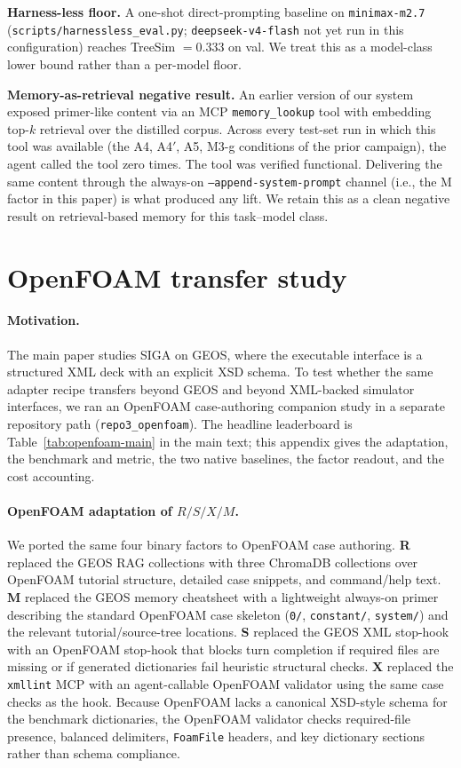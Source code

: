 \documentclass{article}
\begin{document}
\textbf{Harness-less floor.} A one-shot direct-prompting baseline on \texttt{minimax-m2.7} (\texttt{scripts/harnessless\_eval.py}; \texttt{deepseek-v4-flash} not yet run in this configuration) reaches TreeSim $= 0.333$ on val. We treat this as a model-class lower bound rather than a per-model floor.

\textbf{Memory-as-retrieval negative result.} An earlier version of our system exposed primer-like content via an MCP \texttt{memory\_lookup} tool with embedding top-$k$ retrieval over the distilled corpus. Across every test-set run in which this tool was available (the A4, A4$'$, A5, M3-g conditions of the prior campaign), the agent called the tool zero times. The tool was verified functional. Delivering the same content through the always-on \texttt{--append-system-prompt} channel (i.e., the M factor in this paper) is what produced any lift. We retain this as a clean negative result on retrieval-based memory for this task--model class.

\section{OpenFOAM transfer study}
\label{app:openfoam-transfer}

\paragraph{Motivation.}
The main paper studies SIGA on GEOS, where the executable interface is a structured XML deck with an explicit XSD schema. To test whether the same adapter recipe transfers beyond GEOS and beyond XML-backed simulator interfaces, we ran an OpenFOAM case-authoring companion study in a separate repository path (\texttt{repo3\_openfoam}). The headline leaderboard is Table~\ref{tab:openfoam-main} in the main text; this appendix gives the adaptation, the benchmark and metric, the two native baselines, the factor readout, and the cost accounting.

\paragraph{OpenFOAM adaptation of \texorpdfstring{$R/S/X/M$}{R/S/X/M}.}
We ported the same four binary factors to OpenFOAM case authoring. \textbf{R} replaced the GEOS RAG collections with three ChromaDB collections over OpenFOAM tutorial structure, detailed case snippets, and command/help text. \textbf{M} replaced the GEOS memory cheatsheet with a lightweight always-on primer describing the standard OpenFOAM case skeleton (\texttt{0/}, \texttt{constant/}, \texttt{system/}) and the relevant tutorial/source-tree locations. \textbf{S} replaced the GEOS XML stop-hook with an OpenFOAM stop-hook that blocks turn completion if required files are missing or if generated dictionaries fail heuristic structural checks. \textbf{X} replaced the \texttt{xmllint} MCP with an agent-callable OpenFOAM validator using the same case checks as the hook. Because OpenFOAM lacks a canonical XSD-style schema for the benchmark dictionaries, the OpenFOAM validator checks required-file presence, balanced delimiters, \texttt{FoamFile} headers, and key dictionary sections rather than schema compliance.
\end{document}
